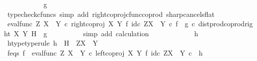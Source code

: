 \begin{isabellebody}
\ \ \ \ \ \ \isamarkupfalse%
\ \isamarkupfalse%
\ {\isachardoublequoteopen}{\isachardot}{\kern0pt}{\isachardot}{\kern0pt}{\isachardot}{\kern0pt}\ {\isacharequal}{\kern0pt}\ g{\isachardoublequoteclose}\isanewline
\ \ \ \ \ \ \ \ \isamarkupfalse%
\ {\isacharparenleft}{\kern0pt}typecheck{\isacharunderscore}{\kern0pt}cfuncs{\isacharcomma}{\kern0pt}\ simp\ add{\isacharcolon}{\kern0pt}\ right{\isacharunderscore}{\kern0pt}coproj{\isacharunderscore}{\kern0pt}cfunc{\isacharunderscore}{\kern0pt}coprod\ sharp{\isacharunderscore}{\kern0pt}cancels{\isacharunderscore}{\kern0pt}flat{\isacharparenright}{\kern0pt}\isanewline
\ \ \ \ \ \ \isamarkupfalse%
\ \isamarkupfalse%
\ {\isachardoublequoteopen}{\isacharparenleft}{\kern0pt}eval{\isacharunderscore}{\kern0pt}func\ Z\ {\isacharparenleft}{\kern0pt}X\ {\isasymCoprod}\ Y{\isacharparenright}{\kern0pt}\ {\isasymcirc}\isactrlsub c\ right{\isacharunderscore}{\kern0pt}coproj\ X\ Y\ {\isasymtimes}\isactrlsub f\ id\isactrlsub c\ {\isacharparenleft}{\kern0pt}Z\isactrlbsup {\isacharparenleft}{\kern0pt}X\ {\isasymCoprod}\ Y{\isacharparenright}{\kern0pt}\isactrlesup {\isacharparenright}{\kern0pt}{\isacharparenright}{\kern0pt}\isactrlsup {\isasymsharp}\ {\isasymcirc}\isactrlsub c\ {\isacharparenleft}{\kern0pt}f\isactrlsup {\isasymflat}\ {\isasymamalg}\ g\isactrlsup {\isasymflat}\ {\isasymcirc}\isactrlsub c\ dist{\isacharunderscore}{\kern0pt}prod{\isacharunderscore}{\kern0pt}coprod{\isacharunderscore}{\kern0pt}right\ X\ Y\ H{\isacharparenright}{\kern0pt}\isactrlsup {\isasymsharp}\ {\isacharequal}{\kern0pt}\ g{\isachardoublequoteclose}\isanewline
\ \ \ \ \ \ \ \ \isamarkupfalse%
\ {\isacharparenleft}{\kern0pt}simp\ add{\isacharcolon}{\kern0pt}\ calculation{\isacharparenright}{\kern0pt}\isanewline
\ \ \ \ \isamarkupfalse%
\isanewline
\ \ \ \ \ \ \isamarkupfalse%
\ h\ \isanewline
\ \ \ \ \ \ \isamarkupfalse%
\ h{\isacharunderscore}{\kern0pt}type{\isacharbrackleft}{\kern0pt}type{\isacharunderscore}{\kern0pt}rule{\isacharbrackright}{\kern0pt}{\isacharcolon}{\kern0pt}\ {\isachardoublequoteopen}h\ {\isacharcolon}{\kern0pt}\ H\ {\isasymrightarrow}\ Z\isactrlbsup {\isacharparenleft}{\kern0pt}X\ {\isasymCoprod}\ Y{\isacharparenright}{\kern0pt}\isactrlesup {\isachardoublequoteclose}\isanewline
\ \ \ \ \ \ \isamarkupfalse%
\ f{\isacharunderscore}{\kern0pt}eqs{\isacharcolon}{\kern0pt}\ {\isachardoublequoteopen}f\ {\isacharequal}{\kern0pt}\ {\isacharparenleft}{\kern0pt}eval{\isacharunderscore}{\kern0pt}func\ Z\ {\isacharparenleft}{\kern0pt}X\ {\isasymCoprod}\ Y{\isacharparenright}{\kern0pt}\ {\isasymcirc}\isactrlsub c\ left{\isacharunderscore}{\kern0pt}coproj\ X\ Y\ {\isasymtimes}\isactrlsub f\ id\isactrlsub c\ {\isacharparenleft}{\kern0pt}Z\isactrlbsup {\isacharparenleft}{\kern0pt}X\ {\isasymCoprod}\ Y{\isacharparenright}{\kern0pt}\isactrlesup {\isacharparenright}{\kern0pt}{\isacharparenright}{\kern0pt}\isactrlsup {\isasymsharp}\ {\isasymcirc}\isactrlsub c\ \ h{\isachardoublequoteclose}\isanewline

\end{isabellebody}
